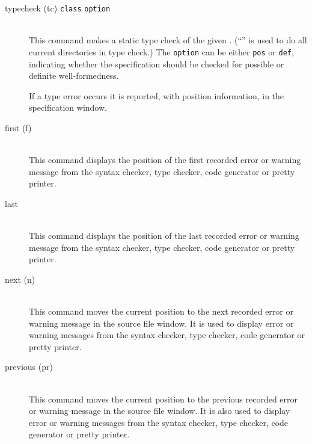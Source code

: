 \documentclass[\pformat,12pt]{article}
\begin{document}
\begin{description}  
\item[typecheck (tc) 
{{\tt class}} {\tt option}]\mbox{}\\ 
  This command makes a static type check of the given
  .
  (``{\tt *}'' is used to do  all current directories in type check.)
  The {\tt option} can be either {\tt pos} or {\tt def}, indicating whether the
  specification should be checked for possible or definite
  well-formedness.

  If a type error occurs it is reported, with position
  information, in the specification window.

\item[first (f)] \mbox{}\\
  This command displays the position of the first recorded error or
  warning message from the syntax checker, type checker, code
  generator or pretty printer.

\item[last] \mbox{}\\
  This command displays the position of the last recorded error or
  warning message from the syntax checker, type checker, code
  generator or pretty printer.

\item[next (n) ]\mbox{}\\
  This command moves the current position to the next recorded error
  or warning message in the source file window.  It is used to
  display error or warning messages from the syntax checker, type
  checker, code generator or pretty printer.

\item[previous (pr)] \mbox{}\\
  This command moves the current position to the previous recorded
  error or warning message in the source file window. It is also used to
  display error or warning messages from the syntax checker, type
  checker, code generator or pretty printer.


\end{description}
\end{document}
